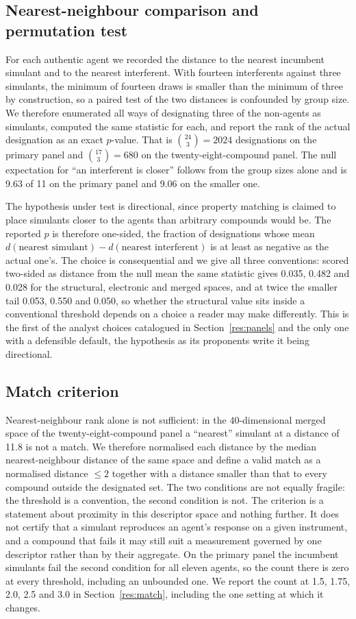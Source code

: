 \documentclass[1p,times]{elsarticle}
\begin{document}
\subsection{Nearest-neighbour comparison and permutation test}
\label{sec:perm}
For each authentic agent we recorded the distance to the nearest incumbent
simulant and to the nearest interferent. With fourteen interferents against three
simulants, the minimum of fourteen draws is smaller than the minimum of three by
construction, so a paired test of the two distances is confounded by group
size. We therefore enumerated all
ways of designating three of the non-agents as simulants, computed the same
statistic for each, and report the rank of the actual designation as an exact
$p$-value. That is $\binom{24}{3}=2024$ designations on the primary panel and
$\binom{17}{3}=680$ on the twenty-eight-compound panel. The null expectation
for ``an interferent is closer'' follows from the group sizes alone and is
9.63 of 11 on the primary panel and 9.06 on the smaller one.

The hypothesis under test is directional, since property matching is claimed to
place simulants closer to the agents than arbitrary compounds would be. The
reported $p$ is therefore one-sided, the fraction of designations whose mean
$d(\text{nearest simulant}) - d(\text{nearest interferent})$ is at least as
negative as the actual one's. The choice is consequential and we give all three
conventions: scored two-sided as distance from the null mean the same statistic
gives 0.035, 0.482 and 0.028 for the structural, electronic and merged spaces,
and at twice the smaller tail 0.053, 0.550 and 0.050, so whether the structural
value sits inside a conventional threshold depends on a choice a reader may make
differently. This
is the first of the analyst choices catalogued in Section~\ref{res:panels} and
the only one with a defensible default, the hypothesis as its proponents write
it being directional.

\subsection{Match criterion}
\label{meth:match}
Nearest-neighbour rank alone is not sufficient: in the 40-dimensional merged
space of the twenty-eight-compound panel a ``nearest'' simulant at a distance of
11.8 is not a match. We therefore
normalised each distance by the median nearest-neighbour distance of the same
space and define a valid match as a normalised distance $\le 2$ together with a
distance smaller than that to every compound outside the designated set. The two
conditions are not equally fragile: the threshold is a convention, the second
condition is not. The criterion is a statement about proximity in this descriptor
space and nothing further. It does not certify that a simulant reproduces an
agent's response on a given instrument, and a compound that fails it may still
suit a measurement governed by one descriptor rather than by their aggregate.
On the primary panel the incumbent simulants fail the second
condition for all eleven agents, so the count there is zero at every threshold,
including an unbounded one. We report the count at 1.5, 1.75, 2.0, 2.5 and 3.0
in Section~\ref{res:match}, including the one setting at which it changes.
\end{document}
